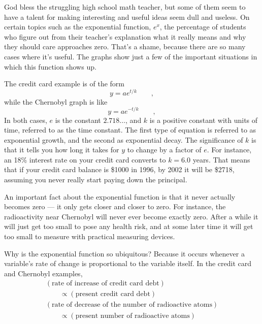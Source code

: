\introduction

God bless the struggling high school math teacher, but some
of them seem to have a talent for making interesting and
useful ideas seem dull and useless. On certain topics such
as the exponential function, $e^x$, the percentage of students
who figure out from their teacher's explanation what it
really means and why they should care approaches zero.
That's a shame, because there are so many cases where it's
useful. The graphs show just a few of the important
situations in which this function shows up.


The credit card example is of the form
\begin{equation*}
    y=ae^{t/k}   \qquad   ,
\end{equation*}
while the Chernobyl graph is like
\begin{equation*}
    y=ae^{-t/k}    \qquad   ,
\end{equation*}
In both cases, $e$ is the constant $2.718\ldots$, and $k$ is a
positive constant with units of time, referred to as the
time constant. The first type of equation is referred to as
exponential growth, and the second as exponential decay. The
significance of $k$ is that it tells you how long it takes
for $y$ to change by a factor of $e$. For instance, an 18\%
interest rate on your credit card converts to $k=6.0$ years.
That means that if your credit card balance is \$1000 in
1996, by 2002 it will be \$2718, assuming you never really
start paying down the principal.

An important fact about the exponential function is that it
never actually becomes zero --- it only gets closer and
closer to zero. For instance, the radioactivity near
Chernobyl will never ever become exactly zero. After a while
it will just get too small to pose any health risk, and at
some later time it will get too small to measure with
practical measuring devices.

Why is the exponential function so ubiquitous? Because it
occurs whenever a variable's rate of change is proportional
to the variable itself. In the credit card and Chernobyl examples,
\begin{gather*}
    (\text{rate of increase of credit card debt}) \\
    \qquad	\propto(\text{present credit card debt})    \\
    (\text{rate of decrease of the number of radioactive atoms}) \\
    \qquad	\propto(\text{present number of radioactive atoms})    
\end{gather*}

